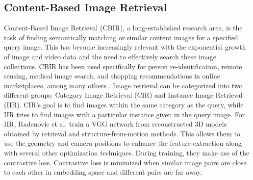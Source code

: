 \documentclass[conference]{IEEEtran}
\begin{document}
\subsection{Content-Based Image Retrieval}
Content-Based Image Retrieval (CBIR), a long-established research area, is the task of finding semantically matching or similar content images for a specified query image.
This has become increasingly relevant with the exponential growth of image and video data and the need to effectively search these image collections.
CBIR has been used specifically for person re-identification, remote sensing, medical image search, and shopping recommendations in online marketplaces, among many others \cite{Chen2021a}.
Image retrieval can be categorized into two different groups: Category Image Retrieval (CIR) and Instance Image Retrieval (IIR).
CIR's goal is to find images within the same category as the query, while IIR tries to find images with a particular instance given in the query image.
For IIR, Radenovic et al. \cite{Radenovic2017} train a VGG network from reconstructed 3D models obtained by retrieval and structure-from-motion methods.
This allows them to use the geometry and camera positions to enhance the feature extraction along with several other optimization techniques.
During training, they make use of the contrastive loss.
Contrastive loss is minimized when similar image pairs are close to each other in embedding space and different pairs are far away.
\end{document}
